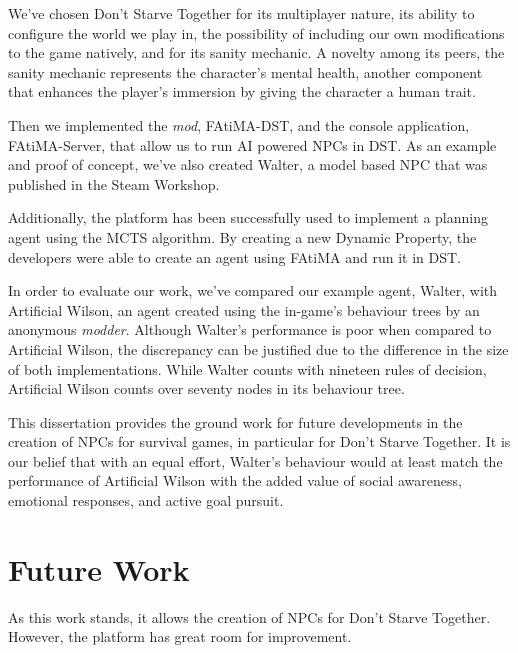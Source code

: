 We've chosen Don't Starve Together for its multiplayer nature, its ability to configure the world we play in, the possibility of including our own modifications to the game natively, and for its sanity mechanic.
A novelty among its peers, the sanity mechanic represents the character's mental health, another component that enhances the player's immersion by giving the character a human trait.

Then we implemented the \textit{mod}, FAtiMA-DST, and the console application, FAtiMA-Server, that allow us to run \ac{AI} powered \acp{NPC} in \ac{DST}.
As an example and proof of concept, we've also created Walter, a model based \ac{NPC} that was published in the Steam Workshop.

Additionally, the platform has been successfully used to implement a planning agent using the \ac{MCTS} algorithm.
By creating a new Dynamic Property, the developers were able to create an agent using \ac{FAtiMA} and run it in \ac{DST}.

In order to evaluate our work, we've compared our example agent, Walter, with Artificial Wilson, an agent created using the in-game's behaviour trees by an anonymous \textit{modder}.
Although Walter's performance is poor when compared to Artificial Wilson, the discrepancy can be justified due to the difference in the size of both implementations.
While Walter counts with nineteen rules of decision, Artificial Wilson counts over seventy nodes in its behaviour tree.

This dissertation provides the ground work for future developments in the creation of \acp{NPC} for survival games, in particular for Don't Starve Together.
It is our belief that with an equal effort, Walter's behaviour would at least match the performance of Artificial Wilson with the added value of social awareness, emotional responses, and active goal pursuit.

\section{Future Work}

\noindent As this work stands, it allows the creation of \acp{NPC} for Don't Starve Together.
However, the platform has great room for improvement.

